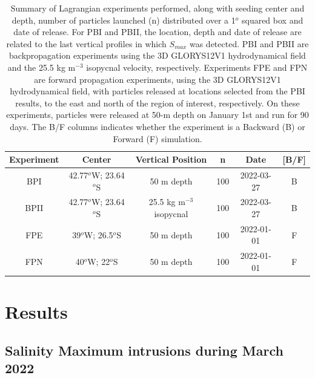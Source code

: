 \documentclass[draft]{agujournal2019}
\begin{document}
\begin{table}[ht!]
\caption{Summary of Lagrangian experiments performed, along with seeding center and depth, number of particles launched (n) distributed over a 1$^o$ squared box and date of release. For PBI and PBII, the location, depth and date of release are related to the last vertical profiles in which \textit{$S_{max}$} was detected. PBI and PBII are backpropagation experiments using the 3D GLORYS12V1 hydrodynamical field and the 25.5 kg m$^{-3}$ isopycnal velocity, respectively. Experiments FPE and FPN are forward propagation experiments, using the 3D GLORYS12V1 hydrodynamical field, with particles released at locations selected from the PBI results, to the east and north of the region of interest, respectively. On these experiments, particles were released at 50-m depth on January 1st and run for 90 days. The B/F columns indicates whether the experiment is a Backward (B) or Forward (F) simulation.}
\label{tab:lagrangian_experiments}
\begin{tabular}{c c c c c c}
\hline
\textbf{Experiment} & \textbf{Center} & \textbf{Vertical Position} & \textbf{n} & \textbf{Date} & \textbf{{[}B/F{]}} \\
\hline
BPI                  & 42.77$^o$W; 23.64$^o$S & 50 m depth                     & 100          & 2022-03-27 & B    \\ 
BPII                 & 42.77$^o$W; 23.64$^o$S & 25.5 kg m$^{-3}$ isopycnal                      & 100         & 2022-03-27 & B     \\ 
FPE                  & 39$^o$W; 26.5$^o$S & 50 m depth                     & 100          & 2022-01-01 & F    \\ 
FPN                  & 40$^o$W; 22$^o$S & 50 m depth                     & 100          & 2022-01-01 & F     \\ 
\hline
\end{tabular}
\end{table}

\section{Results}
\label{section:description}

\subsection{Salinity Maximum intrusions during March 2022}
\label{subsec:smaxdesc}
\end{document}
